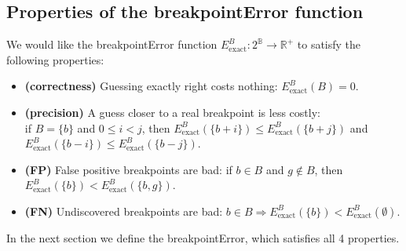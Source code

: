 \documentclass{jsfds} %
\newcommand{\RR}{\mathbb{R}}
\begin{document}
\subsection{Properties of the breakpointError function}

We would like the breakpointError function $E^B_{\text{exact}}:
2^{\mathbb B}\rightarrow \RR^+$ to satisfy the following properties:

\begin{itemize}
\item \textbf{(correctness)} Guessing exactly right costs nothing:
  $E^B_{\text{exact}}(B)=0$.
\item \textbf{(precision)} A guess closer to a real breakpoint is less
  costly:\\if $B=\{b\}$ and $0\leq i<j$, then
  $E^B_{\text{exact}}(\{b+i\})\leq E^B_{\text{exact}}(\{b+j\})$ and
  $E^B_{\text{exact}}(\{b-i\})\leq E^B_{\text{exact}}(\{b-j\})$.
\item \textbf{(FP)} False positive breakpoints are
  bad: if $b\in B$ and $g\not\in B$, then $E^B_{\text{exact}} (\{b\}) <
  E^B_{\text{exact}} (\{b,g\})$.
\item \textbf{(FN)} Undiscovered breakpoints are bad:
  $b\in B\Rightarrow E^B_{\text{exact}}(\{b\}) < E^B_{\text{exact}} (\emptyset)$.
\end{itemize}

In the next section we define the breakpointError, which satisfies all
4 properties. 


\end{document}
